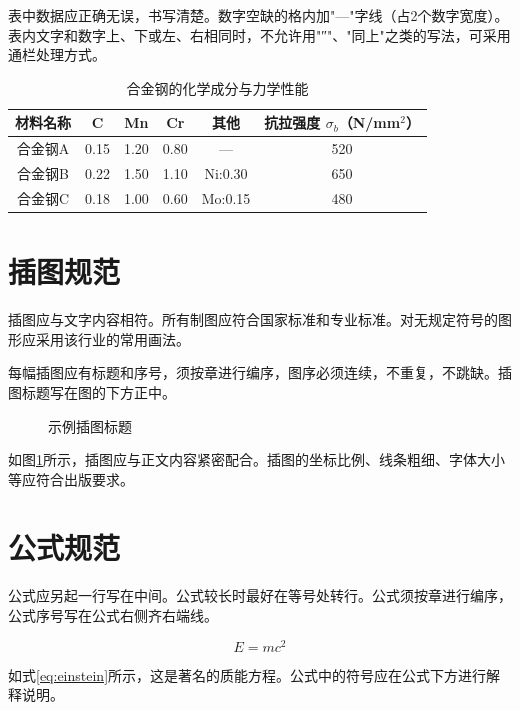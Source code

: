 \documentclass[numbering=arabic,fontset=auto]{jnuthesis}
\begin{document}
表中数据应正确无误，书写清楚。数字空缺的格内加"—"字线（占2个数字宽度）。表内文字和数字上、下或左、右相同时，不允许用"″"、"同上"之类的写法，可采用通栏处理方式。

\begin{table}[htbp]
  \centering
  \caption{合金钢的化学成分与力学性能}
  \label{tab:alloy}
  \begin{tabular}{cccccc}
    \toprule
    材料名称 & C & Mn & Cr & 其他 & 抗拉强度 $\sigma_b$（N/mm$^2$） \\
    \midrule
    合金钢A & 0.15 & 1.20 & 0.80 & — & 520 \\
    合金钢B & 0.22 & 1.50 & 1.10 & Ni:0.30 & 650 \\
    合金钢C & 0.18 & 1.00 & 0.60 & Mo:0.15 & 480 \\
    \bottomrule
  \end{tabular}
\end{table}

\section{插图规范}

插图应与文字内容相符。所有制图应符合国家标准和专业标准。对无规定符号的图形应采用该行业的常用画法。

每幅插图应有标题和序号，须按章进行编序，图序必须连续，不重复，不跳缺。插图标题写在图的下方正中。

\begin{figure}[htbp]
  \centering
  \caption{示例插图标题}
  \label{fig:example}
\end{figure}

如图\ref{fig:example}所示，插图应与正文内容紧密配合。插图的坐标比例、线条粗细、字体大小等应符合出版要求。

\section{公式规范}

公式应另起一行写在中间。公式较长时最好在等号处转行。公式须按章进行编序，公式序号写在公式右侧齐右端线。

\begin{equation}
  E = mc^2
  \label{eq:einstein}
\end{equation}

如式\eqref{eq:einstein}所示，这是著名的质能方程。公式中的符号应在公式下方进行解释说明。
\end{document}

